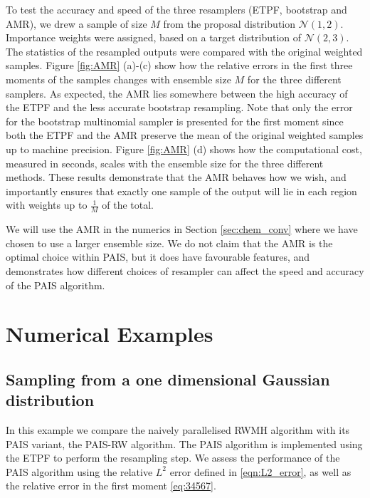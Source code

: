 \documentclass[final]{siamltex}
\begin{document}
To test the accuracy and speed of the three resamplers (ETPF,
bootstrap and AMR), we drew a sample of size $M$ from the proposal distribution
$\mathcal{N}(1,2)$. Importance weights were assigned, based on a
target distribution of $\mathcal{N}(2,3)$. The statistics of the
resampled outputs were compared with the original weighted samples. Figure \ref{fig:AMR} (a)-(c) show how the relative errors in the first
three moments of the samples changes with ensemble size $M$ for the three different
samplers. As expected, the AMR lies somewhere between the high
accuracy of the ETPF and the less accurate bootstrap
resampling. Note that only the error for the bootstrap multinomial
sampler is presented for the first moment since both the ETPF and the
AMR preserve the mean of the original weighted samples up to machine precision. Figure \ref{fig:AMR} (d) shows how the computational cost,
measured in seconds, scales with the ensemble size for the three
different methods. These results demonstrate that the AMR behaves how we wish, and
importantly ensures that exactly one sample of the output will lie in
each region with weights up to $\frac{1}{M}$ of the total.

We will use the AMR in the numerics in Section \ref{sec:chem_conv}
where we have chosen to use a larger ensemble size. We do not claim
that the AMR is the optimal choice within PAIS, but it does have
favourable features, and demonstrates how different choices of
resampler can affect the speed and accuracy of the PAIS algorithm.

\section{Numerical Examples}\label{Sec:Num}

\subsection{Sampling from a one dimensional Gaussian distribution}\label{sec:problem 1}

In this example we compare the naively parallelised RWMH algorithm with its
PAIS variant, the PAIS-RW algorithm. The PAIS algorithm is implemented using the
ETPF to perform the resampling step. We assess the performance of the PAIS algorithm
using the relative $L^2$ error defined in \eqref{eqn:L2_error}, as well as the
relative error in the first moment \eqref{eq:34567}.
\end{document}
